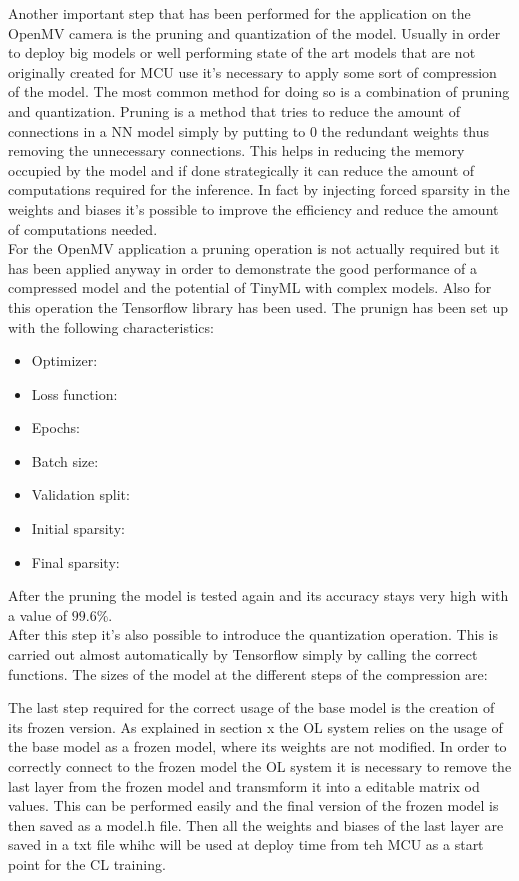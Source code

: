 \documentclass[12pt]{report}
\begin{document}
Another important step that has been performed for the application on the OpenMV camera is the pruning and quantization of the model. Usually in order to deploy big models or well performing state of the art models that are not originally created for MCU use it's necessary to apply some sort of compression of the model. The most common method for doing so is a combination of pruning and quantization. Pruning is a method that tries to reduce the amount of connections in a NN model simply by putting to 0 the redundant weights thus removing the unnecessary connections. This helps in reducing the memory occupied by the model and if done strategically it can reduce the amount of computations required for the inference. In fact by injecting forced sparsity in the weights and biases it's possible to improve the efficiency and reduce the amount of computations needed. \\
For the OpenMV application a pruning operation is not actually required but it has been applied anyway in order to demonstrate the good performance of a compressed model and the potential of TinyML with complex models. Also for this operation the Tensorflow library has been used. The prunign has been set up with the following characteristics:  
\begin{itemize}
	\item Optimizer:
	\item Loss function:
	\item Epochs:
	\item Batch size: 
	\item Validation split: 
	\item Initial sparsity: 
	\item Final sparsity:
\end{itemize}

After the pruning the model is tested again and its accuracy stays very high with a value of $99.6\%$.\\
After this step it's also possible to introduce the quantization operation. This is carried out almost automatically by Tensorflow simply by calling the correct functions. The sizes of the model at the different steps of the compression are: 


The last step required for the correct usage of the base model is the creation of its frozen version. As explained in section x the OL system relies on the usage of the base model as a frozen model, where its weights are not modified. In order to correctly connect to the frozen model the OL system it is necessary to remove the last layer from the frozen model and transmform it into a editable matrix od values. This can be performed easily and the final version of the frozen model is then saved as a model.h file. Then all the weights and biases of the last layer are saved in a txt file whihc will be used at deploy time from teh MCU as a start point for the CL training.  
\end{document}
